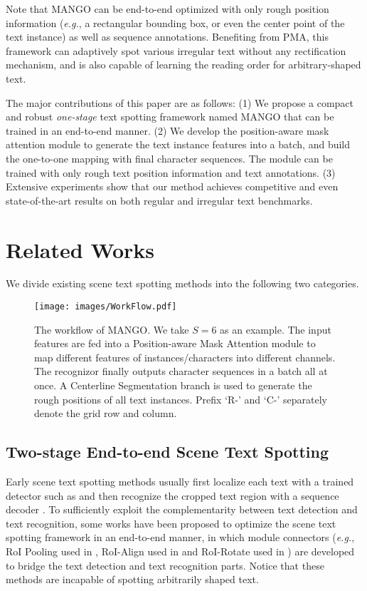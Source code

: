 \documentclass[letterpaper]{article} \usepackage{aaai21}  \usepackage{times}  \usepackage{helvet} \usepackage{courier}  \usepackage[hyphens]{url}  \usepackage{graphicx} \urlstyle{rm} \def\UrlFont{\rm}  \usepackage{natbib}  \usepackage{caption} \frenchspacing  \setlength{\pdfpagewidth}{8.5in}  \setlength{\pdfpageheight}{11in}  \usepackage{multirow}
\begin{document}
Note that MANGO can be end-to-end optimized with only rough position information (\emph{e.g.}, a rectangular bounding box, or even the center point of the text instance) as well as sequence annotations.
Benefiting from PMA, this framework can adaptively spot various irregular text without any rectification mechanism, and is also capable of learning the reading order for arbitrary-shaped text.

The major contributions of this paper are as follows:
(1) We propose a compact and robust \emph{one-stage} text spotting framework named MANGO that can be trained in an end-to-end manner.
(2) We develop the position-aware mask attention module to generate the text instance features into a batch, and build the one-to-one mapping with final character sequences.
The module can be trained with only rough text position information and text annotations.
(3) Extensive experiments show that our method achieves competitive and even state-of-the-art results on both regular and irregular text benchmarks.

\section{Related Works}
We divide existing scene text spotting methods into the following two categories.
\begin{figure*}[th!]
\begin{center}
\texttt{[image: images/WorkFlow.pdf]}\\
\end{center}
\caption{The workflow of MANGO. We take $S$$=$$6$ as an example. The input features are fed into a Position-aware Mask Attention module to map different features of instances/characters into different channels. The recognizor finally outputs character sequences in a batch all at once. A Centerline Segmentation branch is used to generate the rough positions of all text instances. Prefix `R-' and `C-' separately denote the grid row and column.}
\label{framework}
\end{figure*}
\subsection{Two-stage End-to-end Scene Text Spotting}
Early scene text spotting methods \cite{liao2018textboxess,liao2017textboxes,wang2012end} usually first localize each text with a trained detector such as \cite{liao2017textboxes,zhou2017east,he2017single,ma2018arbitrary,xu2019textfield,baek2019character} and then recognize the cropped text region with a sequence decoder \cite{shi2016robust,shi2017end,cheng2017focus,zhan2019esir,luo2019moran}.
To sufficiently exploit the complementarity between text detection and text recognition, some works have been proposed to optimize the scene text spotting framework in an end-to-end manner, in which module connectors (\emph{e.g.}, RoI Pooling \cite{ren2015faster} used in \cite{li2017towards,wang2019towards}, RoI-Align used in \cite{he2018end} and RoI-Rotate used in \cite{liu2018fots}) are developed to bridge the text detection and text recognition parts.
Notice that these methods are incapable of spotting arbitrarily shaped text.
\end{document}
